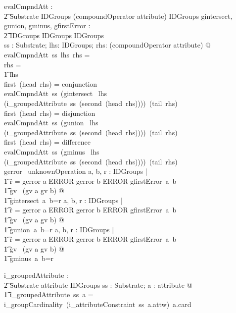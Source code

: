 \documentclass{article}
\begin{document}
\begin{gendef}
   evalCmpndAtt : \\
\t2 Substrate \fun IDGroups \fun \seq (compoundOperator \cross attribute) \fun IDGroups
\also
   gintersect, gunion, gminus, gfirstError : \\
\t2 IDGroups \fun IDGroups \fun IDGroups \\
\where
   \forall ss : Substrate; lhs: IDGroups; rhs: \seq (compoundOperator \cross attribute) @ \\
  evalCmpndAtt~ss~lhs~rhs = \\
 \IF rhs = \langle \rangle \\
\t1 \THEN lhs \\
\ELSE \IF first~(head~rhs) = conjunction \\
\THEN  evalCmpndAtt~ss~(gintersect~ lhs (i\_groupedAttribute~ss~(second~(head~rhs))))~(tail~rhs) \\
 \ELSE \IF first~(head~rhs)  = disjunction \\
\THEN  evalCmpndAtt~ss~(gunion~ lhs (i\_groupedAttribute~ss~(second~(head~rhs))))~(tail~rhs) \\
 \ELSE \IF first~(head~rhs)  = difference \\
\THEN  evalCmpndAtt~ss~(gminus~ lhs (i\_groupedAttribute~ss~(second~(head~rhs))))~(tail~rhs) \\
 \ELSE gerror~ unknownOperation
\also
   \forall a, b, r : IDGroups | \\
\t1 r = \IF gerror \inv a \in ERROR \lor gerror \inv b \in ERROR \THEN gfirstError~a~b \\
\t1 \ELSE gv ~(gv \inv a \cap gv \inv b) @ \\
\t1 gintersect~a~b=r
\also
   \forall a, b, r : IDGroups | \\
\t1 r = \IF gerror \inv a \in ERROR \lor gerror \inv b \in ERROR \THEN gfirstError~a~b \\
\t1 \ELSE gv ~(gv \inv a \cup gv \inv b) @ \\
\t1 gunion~a~b=r
\also
   \forall a, b, r : IDGroups | \\
\t1 r = \IF gerror \inv a \in ERROR \lor gerror \inv b \in ERROR \THEN gfirstError~a~b \\
\t1 \ELSE gv ~(gv \inv a \setminus gv \inv b) @ \\
\t1 gminus~a~b=r
\end{gendef}
\begin{gendef}
   i\_groupedAttribute : \\
\t2 Substrate \fun attribute \fun IDGroups
\where
\forall ss : Substrate; a : attribute @ \\
\t1 i\_groupedAttribute~ss~a =  i\_groupCardinality~(i\_attributeConstraint~ss~a.attw)~a.card \\
\end{gendef}
\end{document}
